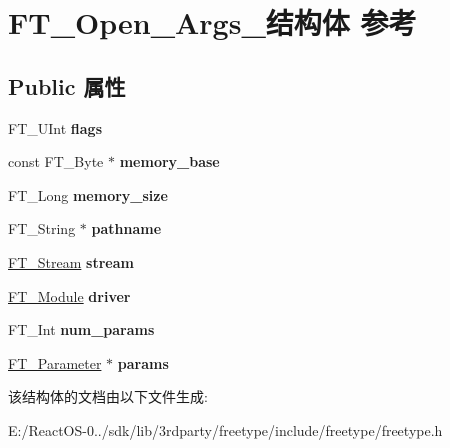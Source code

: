 \hypertarget{struct_f_t___open___args__}{}\section{F\+T\+\_\+\+Open\+\_\+\+Args\+\_\+结构体 参考}
\label{struct_f_t___open___args__}
\subsection*{Public 属性}
\begin{DoxyCompactItemize}
\item 
\mbox{\label{struct_f_t___open___args___a2e3e6b9284fe8b4d9833e247a19181fa}} 
F\+T\+\_\+\+U\+Int {\bfseries flags}
\item 
\mbox{\label{struct_f_t___open___args___a1231da51bc58922096b3bc603bb2ffb0}} 
const F\+T\+\_\+\+Byte $\ast$ {\bfseries memory\+\_\+base}
\item 
\mbox{\label{struct_f_t___open___args___a87f0bb2f257abe94c93a79e0de3525da}} 
F\+T\+\_\+\+Long {\bfseries memory\+\_\+size}
\item 
\mbox{\label{struct_f_t___open___args___aea3d454d9fd9bb7434aad07e651d027b}} 
F\+T\+\_\+\+String $\ast$ {\bfseries pathname}
\item 
\mbox{\label{struct_f_t___open___args___ae1e6444bf0c21b323ce6cbe8bc475b2b}} 
\hyperlink{struct_f_t___stream_rec__}{F\+T\+\_\+\+Stream} {\bfseries stream}
\item 
\mbox{\label{struct_f_t___open___args___a7c01bd7e34a440c3e89141ee521e2646}} 
\hyperlink{struct_f_t___module_rec__}{F\+T\+\_\+\+Module} {\bfseries driver}
\item 
\mbox{\label{struct_f_t___open___args___afaf47d9e1631f2147b696fd7f5a6f4eb}} 
F\+T\+\_\+\+Int {\bfseries num\+\_\+params}
\item 
\mbox{\label{struct_f_t___open___args___a77b279a34beba29bc14901926f79818f}} 
\hyperlink{struct_f_t___parameter__}{F\+T\+\_\+\+Parameter} $\ast$ {\bfseries params}
\end{DoxyCompactItemize}


该结构体的文档由以下文件生成\+:\begin{DoxyCompactItemize}
\item 
E\+:/\+React\+O\+S-\/0../sdk/lib/3rdparty/freetype/include/freetype/freetype.\+h\end{DoxyCompactItemize}
